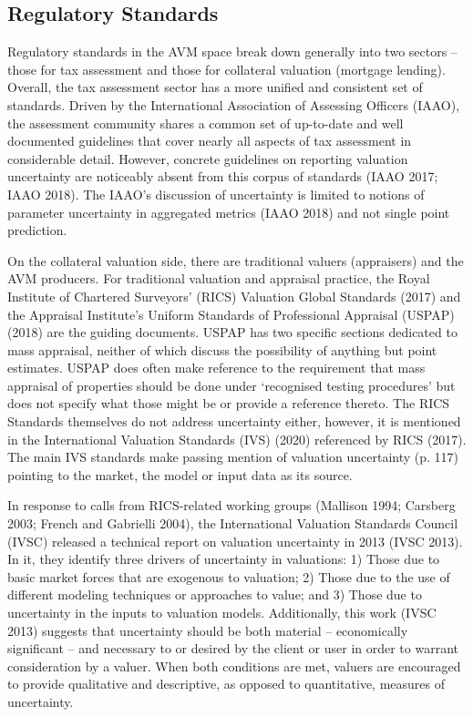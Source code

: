 \documentclass[colTwo]{anon}
\theoremstyle{definition}
\begin{document}
\subsection{Regulatory Standards}

Regulatory standards in the AVM space break down generally into two sectors -- those for tax assessment and those for collateral valuation (mortgage lending).  Overall, the tax assessment sector has a more unified and consistent set of standards.  Driven by the International Association of Assessing Officers (IAAO), the assessment community shares a common set of up-to-date and well documented guidelines that cover nearly all aspects of tax assessment in considerable detail.  However, concrete guidelines on reporting valuation uncertainty are noticeably absent from this corpus of standards (IAAO 2017; IAAO 2018). The IAAO's discussion of uncertainty is limited to notions of parameter uncertainty in aggregated metrics (IAAO 2018) and not single point prediction.

On the collateral valuation side, there are traditional valuers (appraisers) and the AVM producers. For traditional valuation and appraisal practice, the Royal Institute of Chartered Surveyors’ (RICS) Valuation Global Standards (2017) and the Appraisal Institute’s Uniform Standards of Professional Appraisal (USPAP) (2018) are the guiding documents. USPAP has two specific sections dedicated to mass appraisal, neither of which discuss the possibility of anything but point estimates. USPAP does often make reference to the requirement that mass appraisal of properties should be done under ‘recognised testing procedures’ but does not specify what those might be or provide a reference thereto. The RICS Standards themselves do not address uncertainty either, however, it is mentioned in the International Valuation Standards (IVS) (2020) referenced by RICS (2017).  The main IVS standards make passing mention of valuation uncertainty (p. 117) pointing to the market, the model or input data as its source.

In response to calls from RICS-related working groups (Mallison 1994; Carsberg 2003; French and Gabrielli 2004), the International Valuation Standards Council (IVSC) released a technical report on valuation uncertainty in 2013 (IVSC 2013).  In it, they identify three drivers of uncertainty in valuations: 1) Those due to basic market forces that are exogenous to valuation; 2) Those due to the use of different modeling techniques or approaches to value; and 3) Those due to uncertainty in the inputs to valuation models. Additionally, this work (IVSC 2013) suggests that uncertainty should be both material -- economically significant -- and necessary to or desired by the client or user in order to warrant consideration by a valuer. When both conditions are met, valuers are encouraged to provide qualitative and descriptive, as opposed to quantitative, measures of uncertainty.
\end{document}

